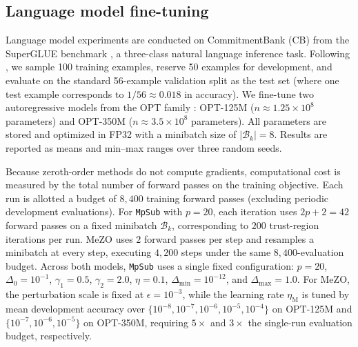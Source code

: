 \documentclass[smallextended]{svjour3}
\begin{document}
\subsection{Language model fine-tuning}
\label{subsec:setup}
\label{subsec:main}
\label{subsec:sensitivity}
\label{subsec:p_ablation}

Language model experiments are conducted on CommitmentBank (CB) from the SuperGLUE benchmark \cite{wang2019superglue}, a three-class natural language inference task. Following \cite{malladi2023mezo}, we sample 100 training examples, reserve 50 examples for development, and evaluate on the standard 56-example validation split as the test set (where one test example corresponds to $1/56 \approx 0.018$ in accuracy). We fine-tune two autoregressive models from the OPT family \cite{zhang2022opt}: OPT-125M ($n \approx 1.25 \times 10^8$ parameters) and OPT-350M ($n \approx 3.5 \times 10^8$ parameters). All parameters are stored and optimized in FP32 with a minibatch size of $|\mathcal B_k| = 8$. Results are reported as means and min--max ranges over three random seeds.

Because zeroth-order methods do not compute gradients, computational cost is measured by the total number of forward passes on the training objective. Each run is allotted a budget of $8{,}400$ training forward passes (excluding periodic development evaluations). For \texttt{MpSub} with $p = 20$, each iteration uses $2p + 2 = 42$ forward passes on a fixed minibatch $\mathcal B_k$, corresponding to $200$ trust-region iterations per run. MeZO uses $2$ forward passes per step and resamples a minibatch at every step, executing $4{,}200$ steps under the same $8{,}400$-evaluation budget. Across both models, \texttt{MpSub} uses a single fixed configuration: $p = 20$, $\Delta_0 = 10^{-1}$, $\gamma_1 = 0.5$, $\gamma_2 = 2.0$, $\eta = 0.1$, $\Delta_{\min} = 10^{-12}$, and $\Delta_{\max} = 1.0$. For MeZO, the perturbation scale is fixed at $\epsilon = 10^{-3}$, while the learning rate $\eta_{\mathrm{M}}$ is tuned by mean development accuracy over $\{10^{-8}, 10^{-7}, 10^{-6}, 10^{-5}, 10^{-4}\}$ on OPT-125M and $\{10^{-7}, 10^{-6}, 10^{-5}\}$ on OPT-350M, requiring $5\times$ and $3\times$ the single-run evaluation budget, respectively.
\end{document}
